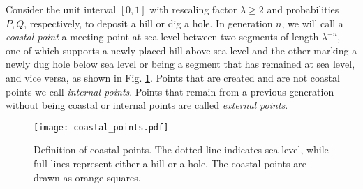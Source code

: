 \documentclass[amsmath,amssymb,amsfonts,aps,pre,preprint,superscriptaddress,bibnotes,showpacs,showkeys,longbibliography,nofootinbib]{revtex4-1}
\begin{document}
Consider the unit interval $[0,1]$ with rescaling factor $\lambda\geq2$ and probabilities $P,Q$, respectively, to deposit a hill or dig a hole. In generation $n$, we will call a \textsl{coastal point} a meeting point at sea level between two segments of length $\lambda^{-n}$, one of which supports a newly placed hill above sea level and the other marking a newly dug hole below sea level or being a segment that has remained at sea level, and vice versa, as shown in Fig. \ref{fig:coastal_points_def}. Points that are created and are not coastal points we call \textsl{internal points}. Points that remain from a previous generation without being coastal or internal points are called \textsl{external points}. 
\begin{figure}[ht]
    \centering
    \texttt{[image: coastal\_points.pdf]}
    \caption{Definition of coastal points. The dotted line indicates sea level, while full lines represent either a hill or a hole. The coastal points are drawn as orange squares.}
    \label{fig:coastal_points_def}
\end{figure}
\end{document}
